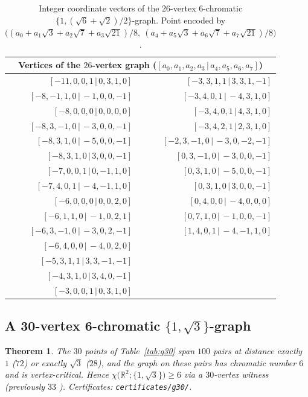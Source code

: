 \documentclass[11pt]{article}
\newtheorem{theorem}{Theorem}[section]
\theoremstyle{definition}
\theoremstyle{remark}
\newcommand{\R}{\mathbb{R}}
\newcommand{\chid}[1]{\chi\bigl(\R^2;#1\bigr)}
\begin{document}
\begin{table}[ht]
\centering\small
\begin{tabular}{@{}rr@{}}
\toprule
\multicolumn{2}{c}{Vertices of the $26$-vertex graph
  ($[a_0,a_1,a_2,a_3\,|\,a_4,a_5,a_6,a_7]$)}\\
\midrule
$[-11,0,0,1\,|\,0,3,1,0]$    & $[-3,3,1,1\,|\,3,3,1,-1]$ \\
$[-8,-1,1,0\,|\,-1,0,0,-1]$  & $[-3,4,0,1\,|\,-4,3,1,0]$ \\
$[-8,0,0,0\,|\,0,0,0,0]$     & $[-3,4,0,1\,|\,4,3,1,0]$ \\
$[-8,3,-1,0\,|\,-3,0,0,-1]$  & $[-3,4,2,1\,|\,2,3,1,0]$ \\
$[-8,3,1,0\,|\,-5,0,0,-1]$   & $[-2,3,-1,0\,|\,-3,0,-2,-1]$ \\
$[-8,3,1,0\,|\,3,0,0,-1]$    & $[0,3,-1,0\,|\,-3,0,0,-1]$ \\
$[-7,0,0,1\,|\,0,-1,1,0]$    & $[0,3,1,0\,|\,-5,0,0,-1]$ \\
$[-7,4,0,1\,|\,-4,-1,1,0]$   & $[0,3,1,0\,|\,3,0,0,-1]$ \\
$[-6,0,0,0\,|\,0,0,2,0]$     & $[0,4,0,0\,|\,-4,0,0,0]$ \\
$[-6,1,1,0\,|\,-1,0,2,1]$    & $[0,7,1,0\,|\,-1,0,0,-1]$ \\
$[-6,3,-1,0\,|\,-3,0,2,-1]$  & $[1,4,0,1\,|\,-4,-1,1,0]$ \\
$[-6,4,0,0\,|\,-4,0,2,0]$    & \\
$[-5,3,1,1\,|\,3,3,-1,-1]$   & \\
$[-4,3,1,0\,|\,3,4,0,-1]$    & \\
$[-3,0,0,1\,|\,0,3,1,0]$     & \\
\bottomrule
\end{tabular}
\caption{Integer coordinate vectors of the $26$-vertex $6$-chromatic
$\{1,(\sqrt6+\sqrt2)/2\}$-graph.  Point encoded by
$\bigl((a_0+a_1\sqrt3+a_2\sqrt7+a_3\sqrt{21})/8,\
(a_4+a_5\sqrt3+a_6\sqrt7+a_7\sqrt{21})/8\bigr)$.}
\label{tab:g26}
\end{table}

\subsection{A 30-vertex 6-chromatic $\{1,\sqrt3\}$-graph}\label{sec:g30}

\begin{theorem}\label{thm:g30}
The $30$ points of Table~\ref{tab:g30} span $100$ pairs at distance
exactly $1$ ($72$) or exactly $\sqrt3$ ($28$), and the graph on these
pairs has chromatic number $6$ and is vertex-critical.  Hence
$\chid{\{1,\sqrt3\}}\ge6$ via a $30$-vertex witness (previously $33$
\cite{DeNeve25}).  Certificates: \texttt{certificates/g30/}.
\end{theorem}
\end{document}
